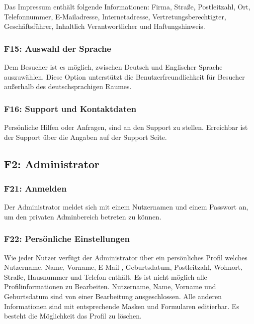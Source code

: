 \documentclass[10pt,a4paper]{scrartcl}
\begin{document}
Das Impressum enthält folgende Informationen: Firma, Straße, Postleitzahl, Ort, Telefonnummer, E-Mailadresse, Internetadresse, Vertretungsberechtigter, \\ Geschäftsführer, Inhaltlich Verantwortlicher und Haftungshinweis.

%

\subsubsection*{F15: Auswahl der Sprache}

Dem Besucher ist es möglich, zwischen Deutsch und Englischer Sprache auszuwählen. Diese Option unterstützt die Benutzerfreundlichkeit für Besucher außerhalb des deutschsprachigen Raumes.

\subsubsection*{F16: Support und Kontaktdaten}

Persönliche Hilfen oder Anfragen, sind an den Support zu stellen. Erreichbar ist der Support \"uber die Angaben auf der Support Seite.


\subsection{F2: Administrator}

\subsubsection*{F21: Anmelden}

Der Administrator meldet sich mit einem Nutzernamen und einem Passwort an, um den privaten Adminbereich betreten zu können.

\subsubsection*{F22: Persönliche Einstellungen}

Wie jeder Nutzer verfügt der Administrator über ein persönliches Profil welches Nutzername, Name, Vorname, E-Mail , Geburtsdatum, Postleitzahl, Wohnort, Straße, 
Hausnummer und Telefon enthält. Es ist nicht möglich alle Profilinformationen zu Bearbeiten. Nutzername, Name, Vorname und Geburtsdatum sind von einer Bearbeitung ausgeschlossen.
Alle anderen Informationen sind mit entsprechende Masken und Formularen editierbar. Es besteht die Möglichkeit das Profil zu löschen.
\end{document}
